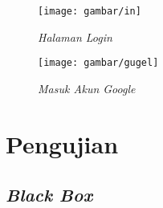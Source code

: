 \begin{figure}[!htbp]
    \centering
    \texttt{[image: gambar/in]}
    \caption{\textit{Halaman Login}}
    \label{in}
\end{figure}

\begin{figure}[!htbp]
    \centering
    \texttt{[image: gambar/gugel]}
    \caption{\textit{Masuk Akun Google}}
    \label{gugel}
\end{figure}

\section{Pengujian}

\subsection{\textit{Black Box}}

